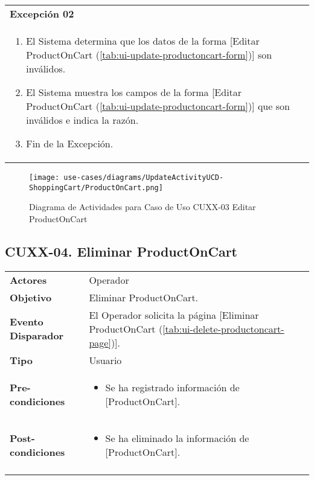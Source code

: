 	\begin{tabular}{ p{15.5cm} }
		\textbf{Excepci\'on 02} \\
		\begin{enumerate}
			\item El Sistema determina que los datos de la forma [Editar ProductOnCart (\ref{tab:ui-update-productoncart-form})] son inv\'alidos.
			\item El Sistema muestra los campos de la forma [Editar ProductOnCart (\ref{tab:ui-update-productoncart-form})] que son inv\'alidos e indica la raz\'on.
			\item Fin de la Excepci\'on.
		\end{enumerate}
	\end{tabular}
	
	\begin{figure}[H]
		\begin{center}
		 \label{tab:activity-update-ucd-entity-productoncart}
		 \texttt{[image: use-cases/diagrams/UpdateActivityUCD-ShoppingCart/ProductOnCart.png]}
		 \caption{Diagrama de Actividades para Caso de Uso CUXX-03 Editar ProductOnCart}
		\end{center}
	\end{figure}
	
	\clearpage
	\subsection{CUXX-04. Eliminar ProductOnCart} \label{sec:cu-delete-ProductOnCart}
	
	\begin{tabular}{ p{3.5cm} p{11.5cm} }
		\textbf{Actores} & Operador\\
		\textbf{Objetivo} & Eliminar ProductOnCart.\\
		\textbf{Evento Disparador} & El Operador solicita la p\'agina [Eliminar ProductOnCart (\ref{tab:ui-delete-productoncart-page})].\\
		\textbf{Tipo} & Usuario\\
		\textbf{Pre-condiciones} &
			\begin{minipage}[t]{0.6\textwidth}
			\begin{itemize}[noitemsep,nolistsep]
			\setlength{\itemindent}{-.5cm}
				\item Se ha registrado informaci\'on de [ProductOnCart].
			\end{itemize}
			\end{minipage} \\
		\textbf{Post-condiciones} &
			\begin{minipage}[t]{0.6\textwidth}
			\begin{itemize}[noitemsep,nolistsep]
			\setlength{\itemindent}{-.5cm}
				\item Se ha eliminado la informaci\'on de [ProductOnCart].
			\end{itemize}
			\end{minipage} \\
		\\
	\end{tabular}
	
